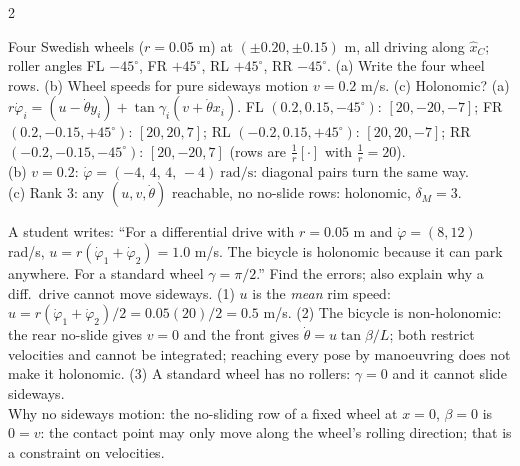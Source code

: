 \begin{multicols}{2}
\begin{examq}
Four Swedish wheels ($r=0.05$ m) at $(\pm0.20,\pm0.15)$ m, all driving along $\hat x_C$; roller angles FL $-45^\circ$, FR $+45^\circ$, RL $+45^\circ$, RR $-45^\circ$. (a) Write the four wheel rows. (b) Wheel speeds for pure sideways motion $v=0.2$ m/s. (c) Holonomic?
\solution
(a) $r\dot\varphi_i=(u-\dot\theta y_i)+\tan\gamma_i(v+\dot\theta x_i)$. FL $(0.2,0.15,-45^\circ)$: $[20,-20,-7]$; FR $(0.2,-0.15,+45^\circ)$: $[20,20,7]$; RL $(-0.2,0.15,+45^\circ)$: $[20,20,-7]$; RR $(-0.2,-0.15,-45^\circ)$: $[20,-20,7]$ (rows are $\frac1r[\cdot]$ with $\frac1r=20$). \\
(b) $v=0.2$: $\boxed{\dot\varphi=(-4,\,4,\,4,\,-4)\ \text{rad/s}}$: diagonal pairs turn the same way. \\
(c) Rank $3$: any $(u,v,\dot\theta)$ reachable, no no-slide rows: holonomic, $\delta_M=3$.  \chk
\end{examq}

\begin{examq}
A student writes: ``For a differential drive with $r=0.05$ m and $\dot\varphi=(8,12)$ rad/s, $u=r(\dot\varphi_1+\dot\varphi_2)=1.0$ m/s. The bicycle is holonomic because it can park anywhere. For a standard wheel $\gamma=\pi/2$.'' Find the errors; also explain why a diff.\ drive cannot move sideways.
\solution
(1) $u$ is the \emph{mean} rim speed: $u=r(\dot\varphi_1+\dot\varphi_2)/2=0.05(20)/2=\boxed{0.5}$ m/s. (2) The bicycle is non-holonomic: the rear no-slide gives $v=0$ and the front gives $\dot\theta=u\tan\beta/L$; both restrict velocities and cannot be integrated; reaching every pose by manoeuvring does not make it holonomic. (3) A standard wheel has no rollers: $\gamma=0$ and it cannot slide sideways. \\
Why no sideways motion: the no-sliding row of a fixed wheel at $x=0$, $\beta=0$ is $0=v$: the contact point may only move along the wheel's rolling direction; that is a constraint on velocities. \chk
\end{examq}


\end{multicols}
